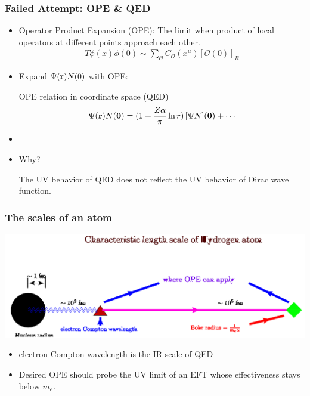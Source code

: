 \begin{frame}
	\frametitle{Failed Attempt: OPE \& QED}

	\begin{itemize}
		\item Operator Product Expansion (OPE): The limit when product of local operators at different points approach each other.
				\begin{align}
					T\phi(x)\phi(0)\sim\sum_{\mathcal{O}}C_{\mathcal{O}}(x^{\mu})[\mathcal{O}(0)]_R
				\end{align}
		\item Expand $\Psi({\bf r}) N(0)$ with OPE: 
		\begin{block}{\large OPE relation in coordinate space (QED)}
			\begin{align*}
				\Psi({\bf r})N({\bf 0})=(1 +{Z \alpha  \over \pi} \ln r)\,[\Psi N]({\bf 0})+\cdots
			\end{align*}
		\end{block}
		\item {}
		\item Why? 
		
		The UV behavior of QED does not reflect the UV behavior of Dirac wave function. 
	\end{itemize}


\end{frame}

\begin{frame}
	\frametitle{The scales of an atom}

		\includegraphics[width=\linewidth]{scale.png}
	\begin{itemize}
		\item electron Compton wavelength is the IR scale of QED
		\item Desired OPE should probe the UV limit of an EFT whose effectiveness stays below $m_e$. 
	\end{itemize}

\end{frame}

